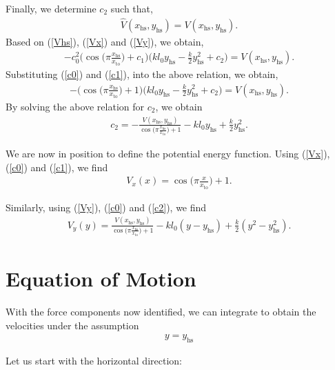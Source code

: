 \documentclass[journal,12pt,onecolumn]{IEEEtran}
\begin{document}
Finally, we determine $c_2$ such that,
\begin{align}
	\label{Vhs}
\hat{V}(x_\text{hs},y_\text{hs}) =  V(x_\text{hs},y_\text{hs}).
\end{align}
Based on (\ref{Vhs}), (\ref{Vx}) and (\ref{Vy}), we obtain,
\begin{align}
-c_0^2 \Big(\cos \Big(\pi\frac{x_\text{hs}}{x_\text{to}} \Big)+ c_1 \Big)  \Big( kl_0y_\text{hs}-\frac{k}{2}y_\text{hs}^2+c_2 \Big) = V(x_\text{hs},y_\text{hs}).
\end{align}
Substituting (\ref{c0}) and (\ref{c1}), into the above relation, we obtain,
\begin{align}
	- \Big(\cos \Big(\pi\frac{x_\text{hs}}{x_\text{to}} \Big)+ 1 \Big)  \Big( kl_0y_\text{hs}-\frac{k}{2}y_\text{hs}^2+c_2 \Big) = V(x_\text{hs},y_\text{hs}).
\end{align}
By solving the above relation for $c_2$, we obtain
\begin{align}
	\label{c2}
c_2 = -\frac{V(x_\text{hs},y_\text{hs})}{\cos \Big(\pi\frac{x_\text{hs}}{x_\text{to}} \Big)+ 1} - kl_0y_\text{hs} +\frac{k}{2}y_\text{hs}^2.
\end{align}

We are now in position to define the potential energy function. Using (\ref{Vx}), (\ref{c0}) and (\ref{c1}), we find
\begin{align}
	V_x(x) = \cos \Big(\pi\frac{x}{x_\text{to}} \Big)+ 1.
\end{align}

Similarly, using (\ref{Vy}), (\ref{c0}) and (\ref{c2}), we find
\begin{align}
	V_y(y) = \frac{V(x_\text{hs},y_\text{hs})}{\cos \Big(\pi\frac{x_\text{hs}}{x_\text{to}} \Big)+ 1} -  kl_0(y-y_\text{hs})+\frac{k}{2}(y^2 - y_\text{hs}^2).
\end{align}

\section{Equation of Motion}
With the force components now identified, we can integrate to obtain the velocities under the assumption
\begin{align}
y = y_{\text{hs}}
\end{align}

Let us start with the horizontal direction:
\end{document}
